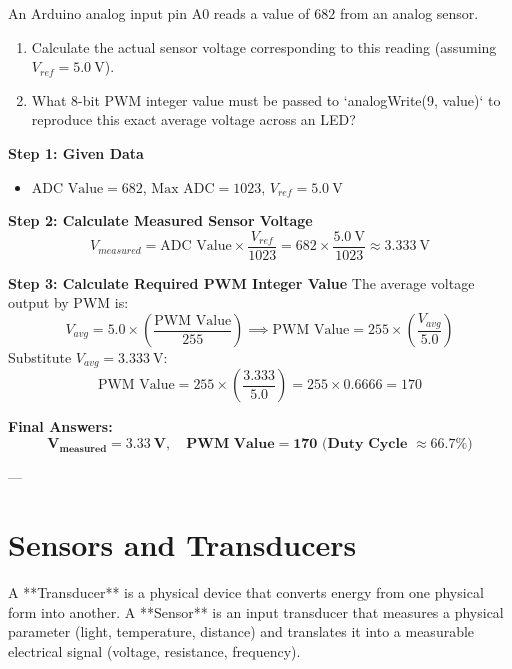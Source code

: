 \begin{example}
An Arduino analog input pin A0 reads a value of $682$ from an analog sensor. 
\begin{enumerate}
    \item Calculate the actual sensor voltage corresponding to this reading (assuming $V_{ref} = \SI{5.0}{\volt}$).
    \item What 8-bit PWM integer value must be passed to `analogWrite(9, value)` to reproduce this exact average voltage across an LED?
\end{enumerate}

\tcblower
\textbf{Step 1: Given Data}
\begin{itemize}
    \item $\text{ADC Value} = 682$, $\text{Max ADC} = 1023$, $V_{ref} = \SI{5.0}{\volt}$
\end{itemize}

\textbf{Step 2: Calculate Measured Sensor Voltage}
\begin{equation*}
    V_{measured} = \text{ADC Value} \times \frac{V_{ref}}{1023} = 682 \times \frac{\SI{5.0}{\volt}}{1023} \approx \SI{3.333}{\volt}
\end{equation*}

\textbf{Step 3: Calculate Required PWM Integer Value}
The average voltage output by PWM is:
\begin{equation*}
    V_{avg} = 5.0 \times \left( \frac{\text{PWM Value}}{255} \right) \implies \text{PWM Value} = 255 \times \left( \frac{V_{avg}}{5.0} \right)
\end{equation*}
Substitute $V_{avg} = \SI{3.333}{\volt}$:
\begin{equation*}
    \text{PWM Value} = 255 \times \left( \frac{3.333}{5.0} \right) = 255 \times 0.6666 = 170
\end{equation*}

\textbf{Final Answers:}
$$\mathbf{V_{measured} = \SI{3.33}{\volt}, \quad \text{PWM Value} = 170 \text{ (Duty Cycle } \approx 66.7\%)}$$
\end{example}

---

\section{Sensors and Transducers}
A **Transducer** is a physical device that converts energy from one physical form into another. A **Sensor** is an input transducer that measures a physical parameter (light, temperature, distance) and translates it into a measurable electrical signal (voltage, resistance, frequency).


